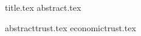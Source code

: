 \documentclass[11pt]{llncs}
\begin{document}
{title.tex}
\thispagestyle{plain}
{abstract.tex}

{abstracttrust.tex}
{economictrust.tex}

\end{document}
